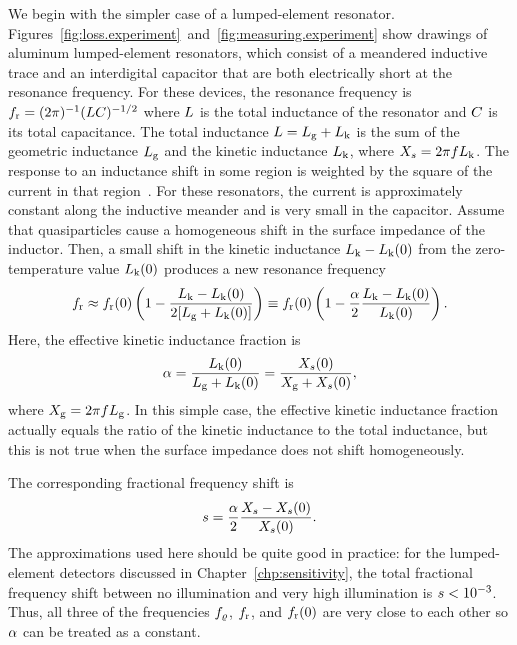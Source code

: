We begin with the simpler case of a lumped-element resonator. 
Figures~\ref{fig:loss.experiment}~and~\ref{fig:measuring.experiment} show drawings of aluminum lumped-element resonators, which consist of a meandered inductive trace and an interdigital capacitor that are both electrically short at the resonance frequency.
For these devices, the resonance frequency is
$f_{\mathrm{r}}
  =
  (2 \pi)^{-1} (L C)^{-1/2}$
where $L$ is the total inductance of the resonator and $C$ is its total capacitance.
The total inductance
$L = L_{\mathrm{g}} + L_{\mathrm{k}}$
is the sum of the geometric inductance $L_{\mathrm{g}}$ and the kinetic inductance $L_{\mathrm{k}}$, where $X_s = 2 \pi f L_{\mathrm{k}}$.
The response to an inductance shift in some region is weighted by the square of the current in that region~\autocite{Mazin2005,Gao2008}.
For these resonators, the current is approximately constant along the inductive meander and is very small in the capacitor.
Assume that quasiparticles cause a homogeneous shift in the surface impedance of the inductor.
Then, a small shift in the kinetic inductance
$L_{\mathrm{k}} - L_{\mathrm{k}}(0)$ from the zero-temperature value $L_{\mathrm{k}}(0)$ produces a new resonance frequency
\begin{equation}
f_{\mathrm{r}}
  \approx
  f_{\mathrm{r}}(0)
  \left( 1 - \frac{L_{\mathrm{k}} - L_{\mathrm{k}}(0)}{2 [L_{\mathrm{g}} + L_{\mathrm{k}}(0)]} \right)
  \equiv
  f_{\mathrm{r}}(0)
  \left( 1 - \frac{\alpha}{2} \frac{L_{\mathrm{k}} - L_{\mathrm{k}}(0)}{L_{\mathrm{k}}(0)} \right).
\end{equation}
Here, the effective kinetic inductance fraction is
\begin{equation}
\alpha
  =
  \frac{L_{\mathrm{k}}(0)}{L_{\mathrm{g}} + L_{\mathrm{k}}(0)}
  =
  \frac{X_s(0)}{X_{\mathrm{g}} + X_s(0)},
\end{equation}
where $X_{\mathrm{g}} = 2 \pi f L_{\mathrm{g}}$.
In this simple case, the effective kinetic inductance fraction actually equals the ratio of the kinetic inductance to the total inductance, but this is not true when the surface impedance does not shift homogeneously.

The corresponding fractional frequency shift is
\begin{equation}
s
  =
  \frac{\alpha}{2} \frac{X_s - X_s(0)}{X_s(0)}.
\end{equation}
The approximations used here should be quite good in practice: for the lumped-element detectors discussed
in Chapter~\ref{chp:sensitivity}, the total fractional frequency shift between no illumination and very high illumination is $s < \num{e-3}$.
Thus, all three of the frequencies $f_\varrho$, $f_{\mathrm{r}}$, and $f_{\mathrm{r}}(0)$ are very close to each other so $\alpha$ can be treated as a constant.

